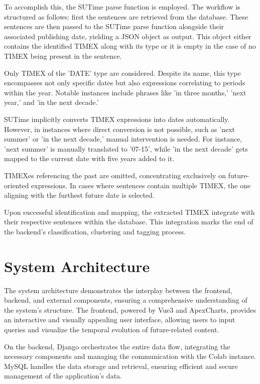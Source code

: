 \documentclass[a4paper,10pt]{report} %
\begin{document}
To accomplish this, the SUTime parse function is employed. The workflow is structured as follows: first the sentences are retrieved from the database. These sentences are then passed to the SUTime parse function alongside their associated publishing date, yielding a JSON object as output. This object either contains the identified TIMEX along with its type or it is empty in the case of no TIMEX being present in the sentence.

Only TIMEX of the 'DATE' type are considered. Despite its name, this type encompasses not only specific dates but also expressions correlating to periods within the year. Notable instances include phrases like 'in three months,' 'next year,' and 'in the next decade.'

SUTime implicitly converts TIMEX expressions into dates automatically. However, in instances where direct conversion is not possible, such as 'next summer' or 'in the next decade,' manual intervention is needed. For instance, 'next summer' is manually translated to '07-15', while 'in the next decade' gets mapped to the current date with five years added to it.

TIMEXes referencing the past are omitted, concentrating exclusively on future-oriented expressions. In cases where sentences contain multiple TIMEX, the one aligning with the furthest future date is selected.

Upon successful identification and mapping, the extracted TIMEX integrate with their respective sentences within the database. This integration marks the end of the backend's classification, clustering and tagging process.

\section{System Architecture}
The system architecture demonstrates the interplay between the frontend, backend, and external components, ensuring a comprehensive understanding of the system's structure. The frontend, powered by Vue3 and ApexCharts, provides an interactive and visually appealing user interface, allowing users to input queries and visualize the temporal evolution of future-related content.

On the backend, Django orchestrates the entire data flow, integrating the necessary components and managing the communication with the Colab instance. MySQL handles the data storage and retrieval, ensuring efficient and secure management of the application's data.
\end{document}
